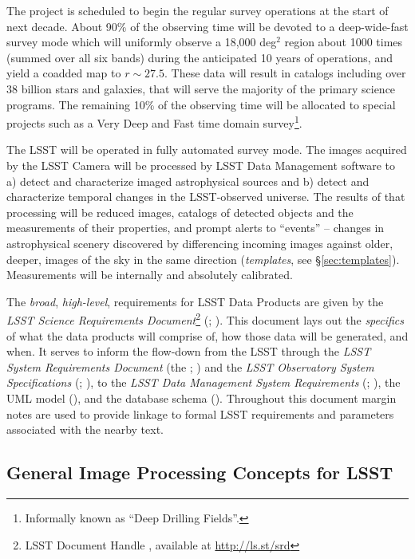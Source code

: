 \documentclass[SE,lsstdraft,toc]{lsstdoc}
\newcommand{\oldtext}[1]{{\color{red} #1}}
\newcommand{\newtext}[1]{{\color{blue} #1}}
\newcommand{\lsstdoc}[1]{{\color{blue}\citell{#1}}}
\begin{document}
The project is scheduled to  begin the regular survey operations at the start of next decade. About 90\% of the observing time will be devoted to a deep-wide-fast survey mode which will uniformly observe a 18,000 deg$^2$ region about 1000 times (summed over all six bands) during the anticipated 10 years of operations, and yield a coadded map to $r\sim27.5$. These data will result in catalogs including over $38$ billion stars and galaxies, that will serve the majority of the primary science programs. The remaining 10\% of the observing time will be allocated to special projects such as a Very Deep and Fast time domain survey\footnote{Informally known as ``Deep Drilling Fields''.}.

The LSST will be operated in fully automated survey mode. The images acquired by the LSST Camera will be processed by LSST Data Management software to a) detect and characterize imaged astrophysical sources and b) detect and characterize temporal changes in the LSST-observed universe. The results of that processing will be reduced images, catalogs of detected objects and the measurements of their properties, and prompt alerts to ``events'' -- changes in astrophysical scenery discovered by differencing incoming images against older, deeper, images of the sky in the same direction (\emph{templates}, see \S \ref{sec:templates}). Measurements will be internally and absolutely calibrated.

The \emph{broad}, \emph{high-level}, requirements for LSST Data Products are given by the \emph{LSST Science Requirements Document}\footnote{\oldtext{LSST Document Handle \lsstdoc{LPM-17}, available at \url{http://ls.st/srd}}} (\SRD; \lsstdoc{LPM-17}). This document lays out the \emph{specifics} of what the data products will comprise of, how those data will be generated, and when. It serves to inform the flow-down from the LSST \SRD through the \emph{LSST System Requirements Document} (the \LSR; \lsstdoc{LSE-29}) and the \emph{LSST Observatory System Specifications} (\OSS; \lsstdoc{LSE-30}), to the \emph{LSST Data Management System Requirements} (\DMSR; \lsstdoc{LSE-61}), the UML model (\appsUMLdomain), and the database schema (\lsstdoc{LDM-153}).
\newtext{Throughout this document margin notes are used to provide linkage to formal LSST requirements and parameters associated with the nearby text.}

\subsection{General Image Processing Concepts for LSST}
\end{document}
